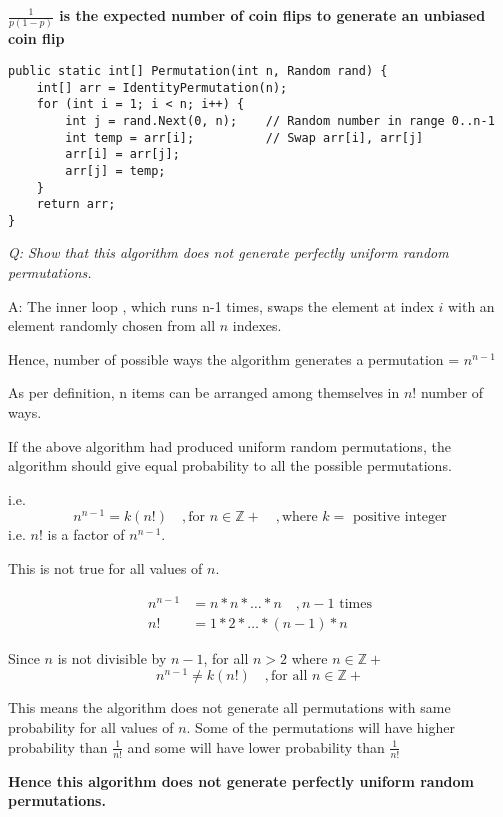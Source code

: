 \documentclass{homeworg}
\begin{document}
\textbf{$\frac{1}{p(1-p)}$ is the expected number of coin flips to generate an unbiased coin flip}
\newpage

\exercise

\begin{verbatim}
public static int[] Permutation(int n, Random rand) {
    int[] arr = IdentityPermutation(n);
    for (int i = 1; i < n; i++) {
        int j = rand.Next(0, n);    // Random number in range 0..n-1
        int temp = arr[i];          // Swap arr[i], arr[j]
        arr[i] = arr[j];
        arr[j] = temp;
    }
    return arr;
}
\end{verbatim}

\emph{Q: Show that this algorithm does not generate perfectly uniform random permutations.}

A: The inner loop , which runs n-1 times, swaps the element at index $i$ with an element randomly chosen from all $n$ indexes.

Hence, number of possible ways the algorithm generates a permutation = $n^{n-1}$

As per definition, n items can be arranged among themselves in $n!$ number of ways.

If the above algorithm had produced uniform random permutations, the algorithm should give equal probability to all the possible permutations. 

i.e. 
\[
    n^{n-1} = k(n!)\quad, \text{for }n \in \mathbb{Z+}\quad, \text{where } k = \text{ positive integer}
\]
i.e. $n!$ is a factor of $n^{n-1}$.

This is not true for all values of $n$. 

\begin{equation*}
\begin{split}
    n^{n-1} &= n \ast n \ast \dots \ast n\quad, n-1\text{ times}\\
    n! &= 1 \ast 2 \ast \dots \ast (n-1) \ast n\quad
\end{split}
\end{equation*}

Since $n$ is not divisible by $n-1$, for all $n>2$ where $n \in \mathbb{Z+}$ 
\[n^{n-1} \ne k(n!) \quad, \text{for all } n \in \mathbb{Z+}\]

This means the algorithm does not generate all permutations with same probability for all values of $n$. Some of the permutations will have higher probability than $\frac{1}{n!}$ and some will have lower probability than $\frac{1}{n!}$

\textbf{ Hence this algorithm does not generate perfectly uniform random permutations. }
\end{document}
